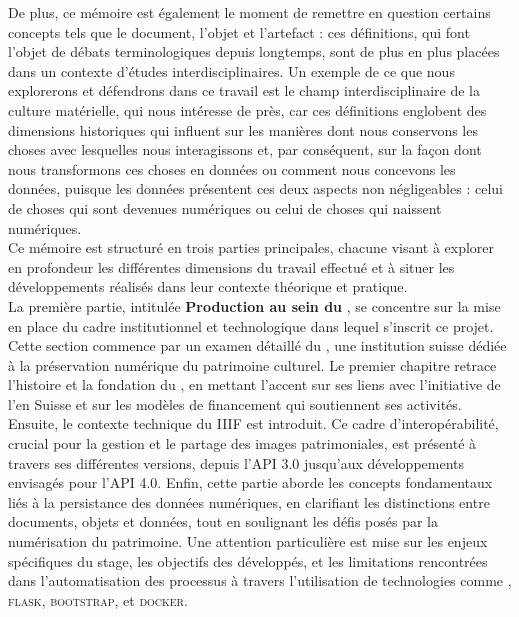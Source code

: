     De plus, ce mémoire est également le moment de remettre en question certains concepts tels que le document, l'objet et l'artefact : ces définitions, qui font l'objet de débats terminologiques depuis longtemps, sont de plus en plus placées dans un contexte d'études interdisciplinaires. Un exemple de ce que nous explorerons et défendrons dans ce travail est le champ interdisciplinaire de la culture matérielle, qui nous intéresse de près, car ces définitions englobent des dimensions historiques qui influent sur les manières dont nous conservons les choses avec lesquelles nous interagissons et, par conséquent, sur la façon dont nous transformons ces choses en données ou comment nous concevons les données, puisque les données présentent ces deux aspects non négligeables : celui de choses qui sont devenues numériques ou celui de choses qui naissent numériques.\\
    
    Ce mémoire est structuré en trois parties principales, chacune visant à explorer en profondeur les différentes dimensions du travail effectué et à situer les développements réalisés dans leur contexte théorique et pratique.\\
    
    La première partie, intitulée \textbf{Production au sein du \dsc}, se concentre sur la mise en place du cadre institutionnel et technologique dans lequel s'inscrit ce projet. Cette section commence par un examen détaillé du \dsc, une institution suisse dédiée à la préservation numérique du patrimoine culturel. Le premier chapitre retrace l'histoire et la fondation du \dsc, en mettant l'accent sur ses liens avec l'initiative de l'\opdt en Suisse et sur les modèles de financement qui soutiennent ses activités. Ensuite, le contexte technique du IIIF est introduit. Ce cadre d'interopérabilité, crucial pour la gestion et le partage des images patrimoniales, est présenté à travers ses différentes versions, depuis l'API 3.0 jusqu'aux développements envisagés pour l'API 4.0. Enfin, cette partie aborde les concepts fondamentaux liés à la persistance des données numériques, en clarifiant les distinctions entre documents, objets et données, tout en soulignant les défis posés par la numérisation du patrimoine. Une attention particulière est mise sur les enjeux spécifiques du stage, les objectifs des  développés, et les limitations rencontrées dans l'automatisation des processus à travers l'utilisation de technologies comme \py, \textsc{flask}, \textsc{bootstrap}, et \textsc{docker}.\\
    
